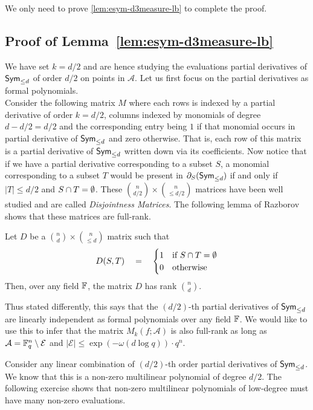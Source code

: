\noindent
We only need to prove \autoref{lem:esym-d3measure-lb} to complete the proof. 

\subsection{Proof of Lemma~\ref{lem:esym-d3measure-lb}}

We have set $k = d/2$ and are hence studying the evaluations partial derivatives of $\operatorname{\mathsf{Sym}}_{\leq d}$ of order $d/2$ on points in $\mathcal{A}$. Let us first focus on the partial derivatives as formal polynomials. \\

Consider the following matrix $M$ where each rows is indexed by a partial derivative of order $k = d/2$, columns indexed by monomials of degree $d -d/2 = d/2$ and the corresponding entry being $1$ if that monomial occurs in partial derivative of $\operatorname{\mathsf{Sym}}_{\leq d}$ and zero otherwise. That is, each row of this matrix is a partial derivative of $\operatorname{\mathsf{Sym}}_{\leq d}$ written down via its coefficients. Now notice that if we have a partial derivative corresponding to a subset $S$, a monomial corresponding to a subset $T$ would be present in $\partial_S(\operatorname{\mathsf{Sym}}_{\leq d})$ if and only if $|T| \leq d/2$ and $S \cap T = \emptyset$. These $\binom{n}{d/2} \times \binom{n}{\leq d/2}$ matrices have been well studied and are called  \emph{Disjointness Matrices}. The following lemma of Razborov~\cite{razborov87} shows that these matrices are full-rank. 
\begin{lemmawp} Let $D$ be a $\binom{n}{d} \times \binom{n}{\leq d}$ matrix such that 
\[
D(S,T) \quad = \quad \begin{cases}
  1 & \text{if $S \cap T = \emptyset$}\\
  0 & \text{otherwise}
\end{cases}
\]
Then, over any field $\mathbb{F}$, the matrix $D$ has rank $\binom{n}{d}$. 
\end{lemmawp}

Thus stated differently, this says that the $(d/2)$-th partial derivatives of $\operatorname{\mathsf{Sym}}_{\leq d}$ are linearly independent as formal polynomials over any field $\mathbb{F}$. We would like to use this to infer that the matrix $M_k(f;\mathcal{A})$ is also full-rank as long as $\mathcal{A} = \mathbb{F}_q^n \setminus \mathcal{E}$ and $|\mathcal{E}| \leq \exp(-\omega(d \log q)) \cdot q^n$. 

Consider any linear combination of $(d/2)$-th order partial derivatives of $\operatorname{\mathsf{Sym}}_{\leq d}$. We know that this is a non-zero multilinear polynomial of degree $d/2$. The following exercise shows that non-zero multilinear polynomials of low-degree must have many non-zero evaluations. 

